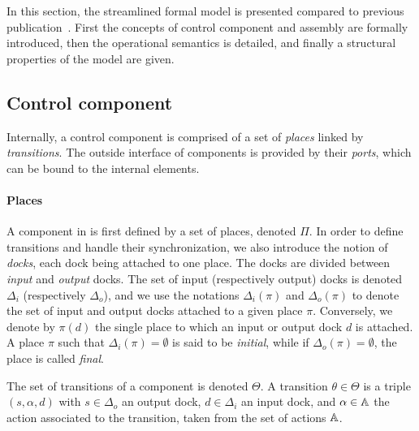 In this section, the streamlined \mad formal model is presented compared to previous publication~\cite{chardet:hal-01858150}. First the concepts of control component and assembly are formally introduced, then the operational semantics is detailed, and finally a structural properties of the model are given.

\subsection{Control component}
\label{sec:mod:comp}

Internally, a \mad control component is comprised of a set of \emph{places}
linked by \emph{transitions}. The outside interface of components is
provided by their \emph{ports}, which can be bound to the internal
elements.

\paragraph{Places}{

A component in \mad is first defined by a set of places, denoted
$\Pi$. In order to define transitions and handle their
synchronization, we also introduce the notion of \emph{docks}, each
dock being attached to one place. The docks are divided between
\emph{input} and \emph{output} docks. The set of input (respectively
output) docks is denoted $\Delta_i$ (respectively $\Delta_o$), and we
use the notations $\Delta_i (\pi)$ and $\Delta_o (\pi)$ to denote the
set of input and output docks attached to a given place
$\pi$. Conversely, we denote by $\pi(d)$ the single place to which an
input or output dock $d$ is attached. A place $\pi$ such that
$\Delta_i(\pi) = \emptyset$ is said to be \emph{initial}, while if
$\Delta_o(\pi) = \emptyset$, the place is called \emph{final}.

The set of transitions of a component is denoted
$\Theta$. A transition $\theta \in \Theta$ is a triple
$\left(s, \alpha, d\right)$ with $s\in\Delta_{o}$ an output dock,
$d\in\Delta_{i}$ an input dock, and $\alpha \in \mathbb{A}$ the action
associated to the transition, taken from the set of actions $\mathbb{A}$.
}

